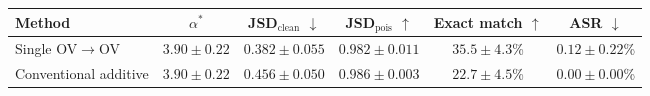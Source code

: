 \begin{tabular}{lccccc}
\toprule
Method & $\alpha^*$ & JSD$_\text{clean}$ $\downarrow$ & JSD$_\text{pois}$ $\uparrow$ & Exact match $\uparrow$ & ASR $\downarrow$ \\
\midrule
Single OV$\to$OV & $3.90 \pm 0.22$ & $0.382 \pm 0.055$ & $0.982 \pm 0.011$ & $35.5 \pm 4.3$\% & $0.12 \pm 0.22$\% \\
Conventional additive & $3.90 \pm 0.22$ & $0.456 \pm 0.050$ & $0.986 \pm 0.003$ & $22.7 \pm 4.5$\% & $0.00 \pm 0.00$\% \\
\bottomrule
\end{tabular}

